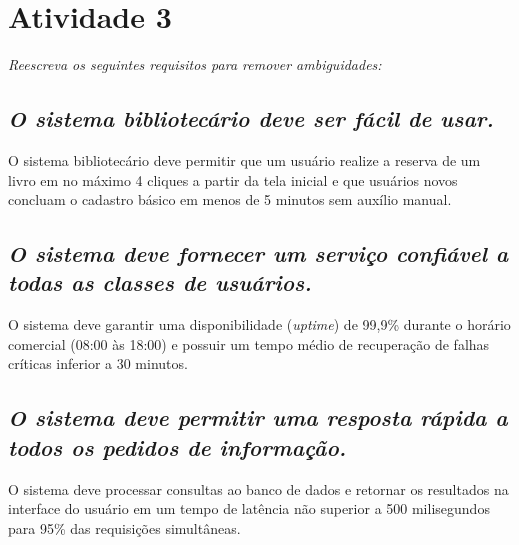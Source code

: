 \documentclass[12pt,a4paper]{article}
\begin{document}
\section*{Atividade 3}
\textit{Reescreva os seguintes requisitos para remover ambiguidades:}

\subsection*{\textit{O sistema bibliotecário deve ser fácil de usar.}}
    O sistema bibliotecário deve permitir que um usuário realize a reserva de um livro em no máximo 4 cliques a partir da tela inicial e que usuários novos concluam o cadastro básico em menos de 5 minutos sem auxílio manual.

\subsection*{\textit{O sistema deve fornecer um serviço confiável a todas as classes de usuários.}}
    O sistema deve garantir uma disponibilidade (\textit{uptime}) de 99,9\% durante o horário comercial (08:00 às 18:00) e possuir um tempo médio de recuperação de falhas críticas inferior a 30 minutos.

\subsection*{\textit{O sistema deve permitir uma resposta rápida a todos os pedidos de informação.}}
    O sistema deve processar consultas ao banco de dados e retornar os resultados na interface do usuário em um tempo de latência não superior a 500 milisegundos para 95\% das requisições simultâneas.
\end{document}
